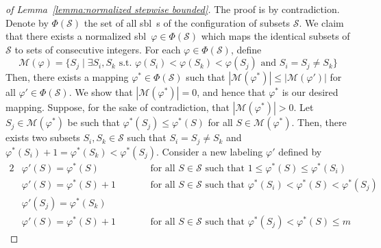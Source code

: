 \documentclass[a4paper,10pt]{llncs}
\newcommand{\SBL}{sbl}
\begin{document}
\begin{proof}[of Lemma~\ref{lemma:normalized stepwise bounded}]
  The proof is by contradiction. Denote by $\Phi(\mathcal{S})$ the set
  of all \SBL\ s of the configuration of subsets $\mathcal{S}$. We claim that
  there exists a normalized \SBL\ $\varphi \in \Phi(\mathcal{S})$
  which maps the identical subsets of $\mathcal{S}$ to sets of consecutive
  integers. For each $\varphi \in \Phi(\mathcal{S})$, define
  $$
  \mathcal{M}(\varphi) = \{S_j \mid \exists S_i, S_k \text{ s.t. }
  \varphi(S_i) < \varphi(S_k) < \varphi(S_j) \text{ and } S_i = S_j \neq S_k\}
  $$
  Then, there exists a mapping $\varphi^* \in \Phi(\mathcal{S})$ such that
  $|\mathcal{M}(\varphi^*)| \leq |\mathcal{M}(\varphi')|$ for all $\varphi' \in
  \Phi(\mathcal{S})$. We show that $|\mathcal{M}(\varphi^*)| = 0$, and hence that
  $\varphi^*$ is our desired mapping. Suppose, for the sake of contradiction,
  that $|\mathcal{M}(\varphi^*)| > 0$. Let $S_j \in \mathcal{M}(\varphi^*)$ be
  such that $\varphi^*(S_j) \leq \varphi^*(S)$ for all
  $S \in \mathcal{M}(\varphi^*)$. Then, there exists two subsets $S_i, S_k \in \mathcal{S}$
  such that $S_i = S_j \neq S_k$ and
  $\varphi^*(S_i) + 1 = \varphi^*(S_k) < \varphi^*(S_j)$.
  Consider a new labeling $\varphi'$ defined by
  \begin{alignat*}{2}
    &\varphi'(S) = \varphi^*(S)         &\qquad& \text{for all $S \in \mathcal{S}$ such that
      $1 \leq \varphi^*(S) \leq \varphi^*(S_i)$} \\
    &\varphi'(S) = \varphi^*(S) + 1     &\qquad& \text{for all $S \in \mathcal{S}$ such that
      $\varphi^*(S_i) < \varphi^*(S) < \varphi^*(S_j)$} \\
    &\varphi'(S_j) = \varphi^*(S_k)               &\qquad& \\
    &\varphi'(S) = \varphi^*(S) + 1     &\qquad& \text{for all $S \in \mathcal{S}$ such that
      $\varphi^*(S_j) < \varphi^*(S) \leq m$}
  \end{alignat*}

%     


\end{proof}
\end{document}
